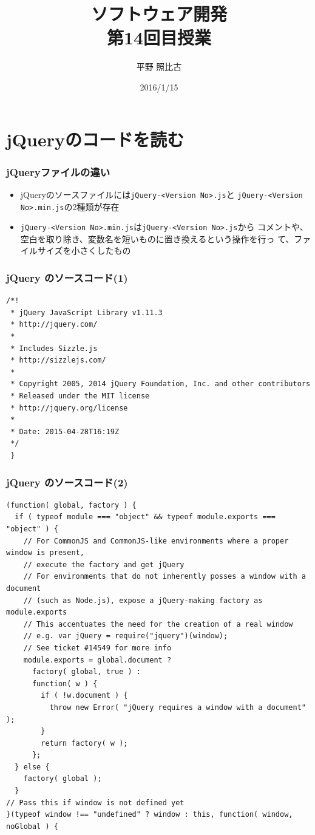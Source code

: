 \documentclass[dvipsk]{beamer}
\title{ソフトウェア開発\\第14回目授業}
\author{平野 照比古}
\institute{}
\date{2016/1/15}
\begin{document}
\frame{\maketitle}
\section{jQueryのコードを読む}
\begin{frame}[containsverbatim]
 \frametitle{jQueryファイルの違い}
\begin{itemize}
 \item jQueryのソースファイルには\texttt{jQuery-<Version No>.js}と
\texttt{jQuery-<Version No>.min.js}の2種類が存在
 \item \texttt{jQuery-<Version No>.min.js}は\texttt{jQuery-<Version No>.js}から
コメントや、空白を取り除き、変数名を短いものに置き換えるという操作を行っ
て、ファイルサイズを小さくしたもの
\end{itemize}
\end{frame}
\begin{frame}[containsverbatim]
 \frametitle{jQuery のソースコード(1)}
 {\footnotesize
\begin{verbatim}
/*!
 * jQuery JavaScript Library v1.11.3
 * http://jquery.com/
 *
 * Includes Sizzle.js
 * http://sizzlejs.com/
 *
 * Copyright 2005, 2014 jQuery Foundation, Inc. and other contributors
 * Released under the MIT license
 * http://jquery.org/license
 *
 * Date: 2015-04-28T16:19Z
 */
 }
\end{verbatim}
 }
\end{frame}
\begin{frame}[containsverbatim]
 \frametitle{jQuery のソースコード(2)}
 {\tiny
\begin{verbatim}
(function( global, factory ) {
  if ( typeof module === "object" && typeof module.exports === "object" ) {
    // For CommonJS and CommonJS-like environments where a proper window is present,
    // execute the factory and get jQuery
    // For environments that do not inherently posses a window with a document
    // (such as Node.js), expose a jQuery-making factory as module.exports
    // This accentuates the need for the creation of a real window
    // e.g. var jQuery = require("jquery")(window);
    // See ticket #14549 for more info
    module.exports = global.document ?
      factory( global, true ) :
      function( w ) {
        if ( !w.document ) {
          throw new Error( "jQuery requires a window with a document" );
        }
        return factory( w );
      };
  } else {
    factory( global );
  }
// Pass this if window is not defined yet
}(typeof window !== "undefined" ? window : this, function( window, noGlobal ) {
\end{verbatim}
 }
\end{frame}
\end{document}
